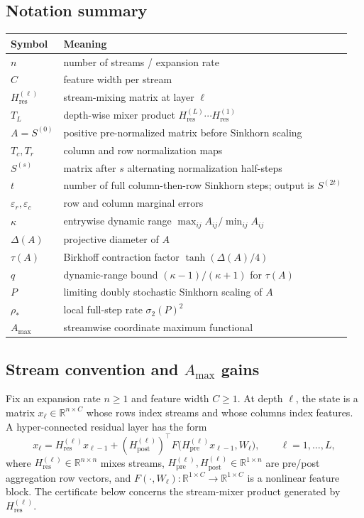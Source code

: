 \documentclass[10pt]{article}
\numberwithin{equation}{section}
\theoremstyle{plain}
\theoremstyle{definition}
\theoremstyle{remark}
\newcommand{\R}{\mathbb{R}}
\newcommand{\Hres}{H_{\mathrm{res}}}
\newcommand{\Hpre}{H_{\mathrm{pre}}}
\newcommand{\Hpost}{H_{\mathrm{post}}}
\newcommand{\Amax}{\texorpdfstring{\ensuremath{A_{\max}}}{Amax}\xspace}
\begin{document}
\subsection*{Notation summary}

\begin{center}
\small
\begin{tabular}{ll}
\toprule
Symbol & Meaning \\
\midrule
\(n\) & number of streams / expansion rate \\
\(C\) & feature width per stream \\
\(\Hres^{(\ell)}\) & stream-mixing matrix at layer \(\ell\) \\
\(T_L\) & depth-wise mixer product
\(\Hres^{(L)}\cdots \Hres^{(1)}\) \\
\(A=S^{(0)}\) & positive pre-normalized matrix before Sinkhorn scaling \\
\(T_c,T_r\) & column and row normalization maps \\
\(S^{(s)}\) & matrix after \(s\) alternating normalization half-steps \\
\(t\) & number of full column-then-row Sinkhorn steps; output is \(S^{(2t)}\) \\
\(\varepsilon_r,\varepsilon_c\) & row and column marginal errors \\
\(\kappa\) & entrywise dynamic range
\(\max_{ij}A_{ij}/\min_{ij}A_{ij}\) \\
\(\Delta(A)\) & projective diameter of \(A\) \\
\(\tau(A)\) & Birkhoff contraction factor \(\tanh(\Delta(A)/4)\) \\
\(q\) & dynamic-range bound \((\kappa-1)/(\kappa+1)\) for \(\tau(A)\) \\
\(P\) & limiting doubly stochastic Sinkhorn scaling of \(A\) \\
\(\rho_*\) & local full-step rate \(\sigma_2(P)^2\) \\
\Amax & streamwise coordinate maximum functional \\
\bottomrule
\end{tabular}
\end{center}


\subsection{Stream convention and \Amax gains}\label{subsec:stream-amax}
Fix an expansion rate $n\ge 1$ and feature width $C\ge 1$. At depth $\ell$, the
state is a matrix $x_\ell\in\R^{n\times C}$ whose rows index streams and whose
columns index features. A hyper-connected residual layer has the form
\begin{equation}\label{eq:mhc-layer}
x_\ell
=
\Hres^{(\ell)} x_{\ell-1}
+
(\Hpost^{(\ell)})^\top F\bigl(\Hpre^{(\ell)}x_{\ell-1}, W_\ell\bigr),
\qquad \ell=1,\dots,L,
\end{equation}
where $\Hres^{(\ell)}\in\R^{n\times n}$ mixes streams,
$\Hpre^{(\ell)},\Hpost^{(\ell)}\in\R^{1\times n}$ are pre/post aggregation row
vectors, and $F(\cdot,W_\ell):\R^{1\times C}\to\R^{1\times C}$ is a nonlinear
feature block. The certificate below concerns the stream-mixer product generated
by $\Hres^{(\ell)}$.
\end{document}
